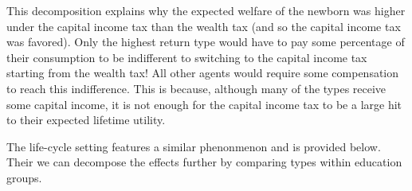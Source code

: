 

\par This decomposition explains why the expected welfare of the newborn was higher under the capital income tax than the wealth tax (and so the capital income tax was favored). Only the highest return type would have to pay some percentage of their consumption to be indifferent to switching to the capital income tax starting from the wealth tax! All other agents would require some compensation to reach this indifference. This is because, although many of the types receive some capital income, it is not enough for the capital income tax to be a large hit to their expected lifetime utility.

\par The life-cycle setting features a similar phenonmenon and is provided below. Their we can decompose the effects further by comparing types within education groups.

